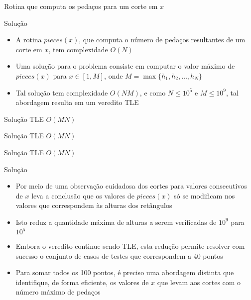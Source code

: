 \begin{frame}[fragile]{Rotina que computa os pedaços para um corte em $x$}
\end{frame}

\begin{frame}[fragile]{Solução}

    \begin{itemize}
        \item A rotina $pieces(x)$, que computa o número de pedaços resultantes de um corte em 
            $x$, tem complexidade $O(N)$

        \item Uma solução para o problema consiste em computar o valor máximo de $pieces(x)$
            para $x \in [1, M]$, onde $M = \max\{ h_1, h_2, \ldots,
            h_N\}$

        \item Tal solução tem complexidade $O(NM)$, e como $N\leq 10^5$ e $M\leq 10^9$, tal 
            abordagem resulta em um veredito TLE
    \end{itemize}

\end{frame}

\begin{frame}[fragile]{Solução TLE $O(MN)$}
\end{frame}

\begin{frame}[fragile]{Solução TLE $O(MN)$}
\end{frame}

\begin{frame}[fragile]{Solução TLE $O(MN)$}
\end{frame}

\begin{frame}[fragile]{Solução}

    \begin{itemize}
        \item Por meio de uma observação cuidadosa dos cortes para valores consecutivos de $x$ 
            leva a conclusão que os valores de $pieces(x)$ só se modificam nos valores que
            correspondem às alturas dos retângulos

        \item Isto reduz a quantidade máxima de alturas a serem verificadas de $10^9$ para $10^5$

        \item Embora o veredito continue sendo TLE, esta redução permite resolver com sucesso o
            conjunto de casos de testes que correspondem a 40 pontos

        \item Para somar todos os 100 pontos, é preciso uma abordagem distinta que identifique,
            de forma eficiente, os valores de $x$ que levam aos cortes com o número máximo de
            pedaços
    \end{itemize}

\end{frame}

